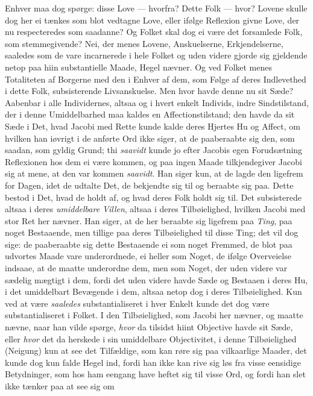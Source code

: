 \documentclass[12pt,a4paper]{book}
\newcommand{\apage}[1]{\marginnote{\footnotesize\textit{[#1]}}}
\begin{document}
Enhver maa dog spørge: disse Love --- hvorfra? Dette Folk --- hvor? Lovene
skulle dog her ei tænkes som blot vedtagne Love, eller ifølge Reflexion givne
Love, der nu \apage{122} respecteredes som saadanne? Og Folket skal dog ei være det
forsamlede Folk, som stemmegivende? Nei, der menes Lovene, Anskuelserne,
Erkjendelserne, saaledes som de vare incarnerede i hele Folket og uden videre
gjorde sig gjeldende netop paa hiin substantielle Maade, Hegel nævner. Og ved
Folket menes Totaliteten af Borgerne med den i Enhver af dem, som Følge af
deres Indlevethed i dette Folk, subsisterende Livsanskuelse. Men hvor havde
denne nu sit Sæde? Aabenbar i alle Individernes, altsaa og i hvert enkelt
Individs, indre Sindstilstand, der i denne Umiddelbarhed maa kaldes en
Affectionstilstand; den havde da sit Sæde i Det, hvad Jacobi med Rette kunde
kalde deres Hjertes Hu og Affect, om hvilken han iøvrigt i de anførte Ord ikke
siger, at de paaberaabte sig den, som saadan, som gyldig Grund; thi \emph{saavidt}
kunde jo efter Jacobis egen Forudsætning Reflexionen hos dem ei være kommen,
og paa ingen Maade tilkjendegiver Jacobi sig at mene, at den var kommen
\emph{saavidt}. Han siger kun, at de lagde den ligefrem for Dagen, idet de udtalte
Det, de bekjendte sig til og beraabte sig paa. Dette bestod i Det, hvad de
holdt af, og hvad deres Folk holdt sig til. Det subsisterede altsaa i deres
\emph{umiddelbare Villen}, altsaa i deres Tilbøielighed, hvilken Jacobi med stor Ret
her nævner. Han siger, at de her beraabte sig ligefrem paa \emph{Ting}, paa noget
Bestaaende, men tillige paa deres Tilbøielighed til disse Ting; det vil dog
sige: de paaberaabte sig dette Bestaaende ei som noget Fremmed, de blot paa
udvortes Maade vare underordnede, ei heller som Noget, de ifølge Overveielse
indsaae, at de maatte underordne dem, men som Noget, der uden videre var
sædelig mægtigt i dem, fordi det uden videre havde Sæde og Bestaaen i deres
Hu, i det umiddelbart Bevægende i dem, altsaa netop dog i deres Tilbøielighed.
Kun ved at være \emph{saaledes} substantialiseret i hver Enkelt kunde det dog være
substantialiseret i Folket. I den Tilbøielighed, som Jacobi her nævner, og
maatte nævne, \apage{123} naar han vilde spørge, \emph{hvor} da tilsidst hiint Objective
havde sit Sæde, eller \emph{hvor} det da herskede i sin umiddelbare
Objectivitet, i denne Tilbøielighed (Neigung) kun at see det Tilfældige, som
kan røre sig paa vilkaarlige Maader, det kunde dog kun falde Hegel ind, fordi
han ikke kan rive sig løs fra visse eensidige Betydninger, som hos ham eengang
have heftet sig til visse Ord, og fordi han slet ikke tænker paa at see sig om
\end{document}
